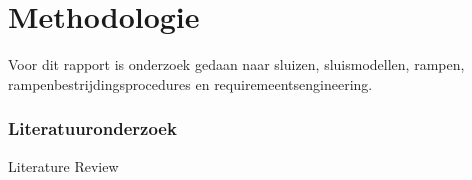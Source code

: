 \graphicspath{{2_Body/Figures/}}




\section{Methodologie}
\label{chapter:body}
\thispagestyle{myheadings}
Voor dit rapport is onderzoek gedaan naar sluizen, sluismodellen, rampen, rampenbestrijdingsprocedures en requiremeentsengineering.

\subsubsection{Literatuuronderzoek}
\begin{frame}{Literature Review}
	\begin{table}[htbp]
		\footnotesize
		

\end{table}
\end{frame}
